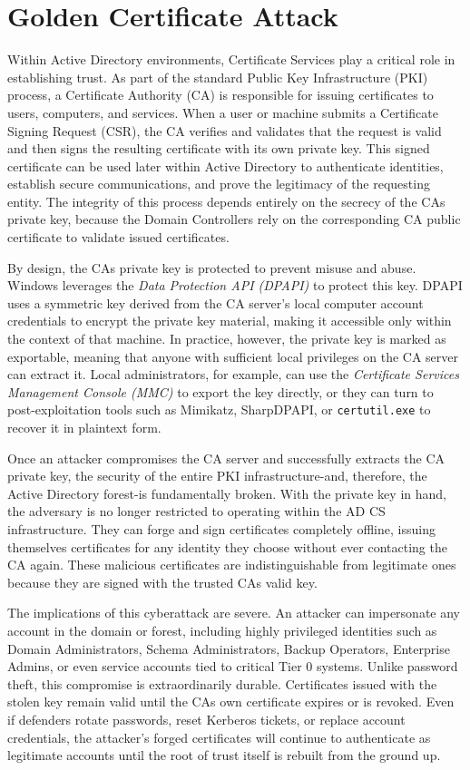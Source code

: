 {\section{Golden Certificate Attack}
Within Active Directory environments, Certificate Services play a critical role in establishing trust. As part of the standard Public Key Infrastructure (PKI) process, a Certificate Authority (CA) is responsible for issuing certificates to users, computers, and services. When a user or machine submits a Certificate Signing Request (CSR), the CA verifies and validates that the request is valid and then signs the resulting certificate with its own private key. This signed certificate can be used later within Active Directory to authenticate identities, establish secure communications, and prove the legitimacy of the requesting entity. The integrity of this process depends entirely on the secrecy of the CAs private key, because the Domain Controllers rely on the corresponding CA public certificate to validate issued certificates.

By design, the CAs private key is protected to prevent misuse and abuse. Windows leverages the \textit{Data Protection API (DPAPI)} to protect this key. DPAPI uses a symmetric key derived from the CA server's local computer account credentials to encrypt the private key material, making it accessible only within the context of that machine. In practice, however, the private key is marked as exportable, meaning that anyone with sufficient local privileges on the CA server can extract it. Local administrators, for example, can use the \textit{Certificate Services Management Console (MMC)} to export the key directly, or they can turn to post-exploitation tools such as Mimikatz, SharpDPAPI, or \texttt{certutil.exe} to recover it in plaintext form.

Once an attacker compromises the CA server and successfully extracts the CA private key, the security of the entire PKI infrastructure-and, therefore, the Active Directory forest-is fundamentally broken. With the private key in hand, the adversary is no longer restricted to operating within the AD CS infrastructure. They can forge and sign certificates completely offline, issuing themselves certificates for any identity they choose without ever contacting the CA again. These malicious certificates are indistinguishable from legitimate ones because they are signed with the trusted CAs valid key.

The implications of this cyberattack are severe. An attacker can impersonate any account in the domain or forest, including highly privileged identities such as Domain Administrators, Schema Administrators, Backup Operators, Enterprise Admins, or even service accounts tied to critical Tier 0 systems. Unlike password theft, this compromise is extraordinarily durable. Certificates issued with the stolen key remain valid until the CAs own certificate expires or is revoked. Even if defenders rotate passwords, reset Kerberos tickets, or replace account credentials, the attacker's forged certificates will continue to authenticate as legitimate accounts until the root of trust itself is rebuilt from the ground up.

}
